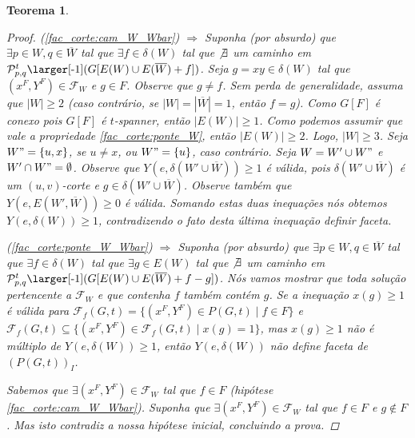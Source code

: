 \documentclass[11pt,reqno]{amsart}
\newcommand{\smallWWbarf}{\mbox{\larger[-1]$(G[E(W) \cup E(\overline{W})+f])$}}
\newcommand{\smallWWbarfg}{\mbox{\larger[-1]$(G[E(W) \cup E(\overline{W})+f-g])$}}
\newcommand{\spanPath}{\mathcal{P}}
\newcommand{\Pathpq}{\spanPath_{p,q}^{t}}
\newcommand{\PathpqWWbarf}{\Pathpq\smallWWbarf}
\newcommand{\PathpqWWbarfg}{\Pathpq\smallWWbarfg}
\newtheorem{teorema}{Teorema}
\newcommand{\incid}{\mathcal{X}}
\newcommand{\incidY}{\mathcal{Y}}
\newcommand{\facetF}{\mathcal{F}}
\begin{document}
\begin{teorema}
\begin{proof}

(\ref{fac_corte:cam_W_Wbar}) $\Rightarrow$ Suponha (por absurdo) que 
$\exists p \in W, q \in \overline{W}$ tal que $\exists f \in \delta(W)$ tal que 
$\not \exists$ um caminho em $\PathpqWWbarf$. 
Seja $g=xy \in \delta(W)$ tal que $(x^{F},Y^{F}) \in \facetF_{W}$ e $g \in F$. 
Observe que $g \neq f$. Sem perda de generalidade, 
assuma que $|W| \ge 2$ (caso contrário, se $|W| = |\overline{W}| = 1$, então $f = g$). 
Como $G[F]$ é conexo pois $G[F]$ é $t$-spanner, então 
$|E(W)| \ge 1$. Como podemos assumir que vale a propriedade \ref{fac_corte:ponte_W}, 
então $|E(W)| \ge 2$. Logo, $|W| \ge 3$. Seja $W" = \{u,x\}$, se $u \neq x$, ou 
$W" = \{u\}$, caso contrário. 
Seja $W = W' \cup W"$ e 
$W'\cap W" = \emptyset$. Observe que $Y(e,\delta(W' \cup \overline{W})) \ge 1$
 é válida, pois $\delta(W' \cup \overline{W})$ é um $(u,v)$-corte e 
$g \in \delta(W' \cup \overline{W})$. Observe também que 
$Y(e,E(W',\overline{W})) \ge 0$ é válida. Somando estas duas inequações nós 
obtemos $Y(e,\delta(W)) \ge 1$, contradizendo o fato desta última inequação definir 
faceta. 

(\ref{fac_corte:ponte_W_Wbar}) $\Rightarrow$ Suponha (por absurdo) que 
$\exists p \in W, q \in \overline{W}$ tal que $\exists f \in \delta(W)$ tal que 
$\exists g \in E(W)$ tal que $\not \exists$  um caminho em $\PathpqWWbarfg$. 
Nós vamos mostrar 
que toda solução pertencente a $\facetF_{W}$ e que contenha $f$ também contém $g$. 
Se a inequação $x(g) \ge 1$ é válida para 
$\facetF_f(G,t) = \{(x^{F},Y^{F}) \in P(G,t)\;|\;f \in F\}$ e 
$\facetF_f(G,t) \subseteq \{(x^{F},Y^{F}) \in \facetF_f(G,t)\;|\;x(g) = 1\}$, 
mas $x(g) \ge 1$ não é múltiplo de $Y(e,\delta(W)) \ge 1$, então 
$Y(e,\delta(W))$ não define faceta de $(P(G,t))_{I}$.

Sabemos que $\exists (x^{F},Y^{F}) \in \facetF_W$ tal que $f \in F$ 
(hipótese \ref{fac_corte:cam_W_Wbar}). 
Suponha que $\exists (x^{F},Y^{F}) \in \facetF_{W}$ tal que $f \in F$ e 
$g \notin F$. Mas isto contradiz a nossa hipótese inicial, concluindo a prova. 
\end{proof}
\end{teorema}

 

 
\end{document}
